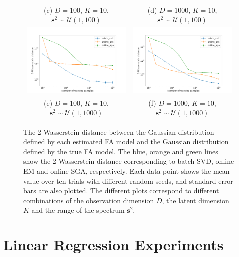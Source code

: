 \documentclass[msc,deptreport.inf]{infthesis} %
\newcommand{\matr}[1]{\mathbf{#1}}
\begin{document}
\begin{figure}[!htbp]
\begin{tabular}{cc}
		 (c) $D=100$, $K=10$, $\matr{s}^2 \sim \mathcal{U}(1, 100)$ 
		 & (d) $D=1000$, $K=10$, $\matr{s}^2 \sim \mathcal{U}(1, 100)$\\[6pt]
		 \includegraphics[width=70mm]{plots/online_fa_wasserstein__observation_dim=100__latent_dim=10__spectrum_min=1__spectrum_max=1000.png} 
		 & \includegraphics[width=70mm]{plots/online_fa_wasserstein__observation_dim=1000__latent_dim=10__spectrum_min=1__spectrum_max=1000.png} \\
		 (e) $D=100$, $K=10$, $\matr{s}^2 \sim \mathcal{U}(1, 1000)$ 
		 & (f) $D=1000$, $K=10$, $\matr{s}^2 \sim \mathcal{U}(1, 1000)$\\[6pt]
	\end{tabular}
	\caption{The 2-Wasserstein distance between the Gaussian distribution defined by each estimated FA model and the Gaussian distribution defined by the true FA model. The blue, orange and green lines show the 2-Wasserstein distance corresponding to batch SVD, online EM and online SGA, respectively. Each data point shows the mean value over ten trials with different random seeds, and standard error bars are also plotted. The different plots correspond to different combinations of the observation dimension $D$, the latent dimension $K$ and the range of the spectrum $\matr{s}^2$.}
	\label{fig:fa_wasserstein}
\end{figure}


\chapter{Linear Regression Experiments}\label{ch:linear_regression_experiments}
\end{document}
